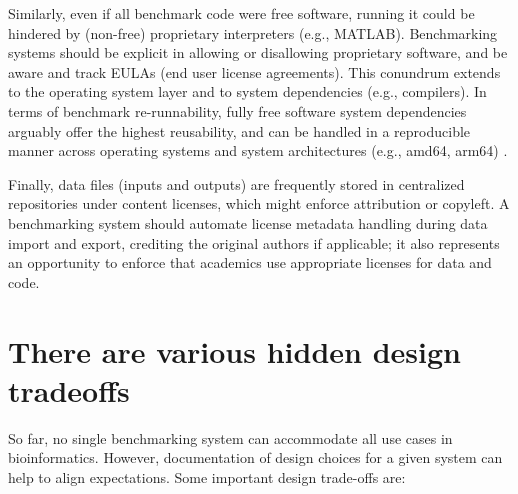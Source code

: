 \documentclass[11pt]{article}
\begin{document}

Similarly, even if all benchmark code were free software, running it could be hindered by (non-free) proprietary interpreters (e.g., MATLAB). Benchmarking systems should be explicit in allowing or disallowing proprietary software, and be aware and track EULAs (end user license agreements). This conundrum extends to the operating system layer and to system dependencies (e.g., compilers). In terms of benchmark re-runnability, fully free software system dependencies arguably offer the highest reusability, and can be handled in a reproducible manner across operating systems and system architectures (e.g., amd64, arm64) \cite{droge2023-ax}.

Finally, data files (inputs and outputs) are frequently stored in centralized repositories \cite{Potter2015-fs, Sicilia2017-ko, van-de-Sandt2019-wd} under content licenses, which might enforce attribution or copyleft. A benchmarking system should automate license metadata handling during data import and export, crediting the original authors if applicable; it also represents an opportunity to enforce that academics use appropriate licenses for data and code. 


\section*{There are various hidden design tradeoffs}

So far, no single benchmarking system can accommodate all use cases in bioinformatics. However, documentation of design choices for a given system can help to align expectations. Some important design trade-offs are:
\end{document}
